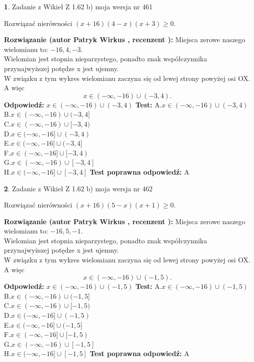 \documentclass[12pt, a4paper]{article}
\theoremstyle{definition} %
\newtheorem{zad}{}
\newcommand{\zadStart}[1]{\begin{zad}#1\newline}
\newcommand{\zadStop}{\end{zad}}
\newcommand{\rozwStart}[2]{\noindent \textbf{Rozwiązanie (autor #1 , recenzent #2): }\newline}
\newcommand{\rozwStop}{\newline}
\newcommand{\odpStart}{\noindent \textbf{Odpowiedź:}\newline}
\newcommand{\odpStop}{\newline}
\newcommand{\testStart}{\noindent \textbf{Test:}\newline}
\newcommand{\testStop}{\newline}
\newcommand{\kluczStart}{\noindent \textbf{Test poprawna odpowiedź:}\newline}
\newcommand{\kluczStop}{\newline}
\begin{document}
\zadStart{Zadanie z Wikieł Z 1.62 b) moja wersja nr 461}

Rozwiązać nierówności $(x+16)(4-x)(x+3)\ge0$.
\zadStop
\rozwStart{Patryk Wirkus}{}
Miejsca zerowe naszego wielomianu to: $-16, 4, -3$.\\
Wielomian jest stopnia nieparzystego, ponadto znak współczynnika przy\linebreak najwyższej potędze x jest ujemny.\\ W związku z tym wykres wielomianu zaczyna się od lewej strony powyżej osi OX. A więc $$x \in (-\infty,-16) \cup (-3,4).$$
\rozwStop
\odpStart
$x \in (-\infty,-16) \cup (-3,4)$
\odpStop
\testStart
A.$x \in (-\infty,-16) \cup (-3,4)$\\
B.$x \in (-\infty,-16) \cup (-3,4]$\\
C.$x \in (-\infty,-16) \cup [-3,4)$\\
D.$x \in (-\infty,-16] \cup (-3,4)$\\
E.$x \in (-\infty,-16] \cup (-3,4]$\\
F.$x \in (-\infty,-16] \cup [-3,4)$\\
G.$x \in (-\infty,-16) \cup [-3,4]$\\
H.$x \in (-\infty,-16] \cup [-3,4]$
\testStop
\kluczStart
A
\kluczStop



\zadStart{Zadanie z Wikieł Z 1.62 b) moja wersja nr 462}

Rozwiązać nierówności $(x+16)(5-x)(x+1)\ge0$.
\zadStop
\rozwStart{Patryk Wirkus}{}
Miejsca zerowe naszego wielomianu to: $-16, 5, -1$.\\
Wielomian jest stopnia nieparzystego, ponadto znak współczynnika przy\linebreak najwyższej potędze x jest ujemny.\\ W związku z tym wykres wielomianu zaczyna się od lewej strony powyżej osi OX. A więc $$x \in (-\infty,-16) \cup (-1,5).$$
\rozwStop
\odpStart
$x \in (-\infty,-16) \cup (-1,5)$
\odpStop
\testStart
A.$x \in (-\infty,-16) \cup (-1,5)$\\
B.$x \in (-\infty,-16) \cup (-1,5]$\\
C.$x \in (-\infty,-16) \cup [-1,5)$\\
D.$x \in (-\infty,-16] \cup (-1,5)$\\
E.$x \in (-\infty,-16] \cup (-1,5]$\\
F.$x \in (-\infty,-16] \cup [-1,5)$\\
G.$x \in (-\infty,-16) \cup [-1,5]$\\
H.$x \in (-\infty,-16] \cup [-1,5]$
\testStop
\kluczStart
A
\kluczStop
\end{document}
